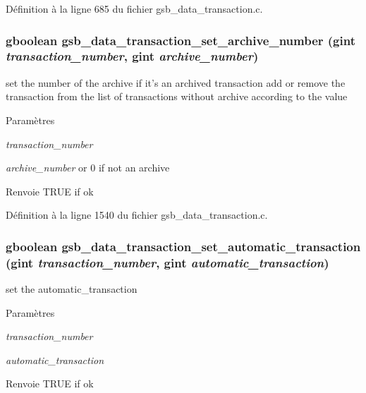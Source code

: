 Définition à la ligne 685 du fichier gsb\_\-data\_\-transaction.c.

\subsubsection[{gsb\_\-data\_\-transaction\_\-set\_\-archive\_\-number}]{\setlength{\rightskip}{0pt plus 5cm}gboolean gsb\_\-data\_\-transaction\_\-set\_\-archive\_\-number (gint {\em transaction\_\-number}, \/  gint {\em archive\_\-number})}\label{gsb__data__transaction_8c_adc4e030e27ded40c7fde043e91ca8811}
set the number of the archive if it's an archived transaction add or remove the transaction from the list of transactions without archive according to the value


\begin{DoxyParams}{Paramètres}
\item[{\em transaction\_\-number}]\item[{\em archive\_\-number}]or 0 if not an archive\end{DoxyParams}
\begin{DoxyReturn}{Renvoie}
TRUE if ok 
\end{DoxyReturn}


Définition à la ligne 1540 du fichier gsb\_\-data\_\-transaction.c.

\subsubsection[{gsb\_\-data\_\-transaction\_\-set\_\-automatic\_\-transaction}]{\setlength{\rightskip}{0pt plus 5cm}gboolean gsb\_\-data\_\-transaction\_\-set\_\-automatic\_\-transaction (gint {\em transaction\_\-number}, \/  gint {\em automatic\_\-transaction})}\label{gsb__data__transaction_8c_a6211d83ecff1be17883d8cc6427a19aa}
set the automatic\_\-transaction 
\begin{DoxyParams}{Paramètres}
\item[{\em transaction\_\-number}]\item[{\em automatic\_\-transaction}]\end{DoxyParams}
\begin{DoxyReturn}{Renvoie}
TRUE if ok 
\end{DoxyReturn}


